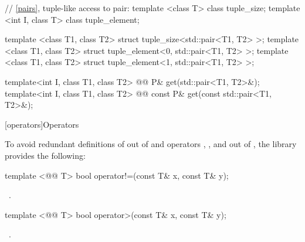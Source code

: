 \documentclass[american,twoside]{book}
\begin{document}
\begin{codeblock}
{  // \ptr\ref{pairs}, tuple-like access to pair:
  template <class T> class tuple_size;
  template <int I, class T> class tuple_element;

  template <class T1, class T2> struct tuple_size<std::pair<T1, T2> >;
  template <class T1, class T2> struct tuple_element<0, std::pair<T1, T2> >;
  template <class T1, class T2> struct tuple_element<1, std::pair<T1, T2> >;

  template<int I, class T1, class T2> 
    @@
    P& get(std::pair<T1, T2>&);
  template<int I, class T1, class T2> 
    @@
    const P& get(const std::pair<T1, T2>&);
}
\end{codeblock}

[operators]{Operators}


\pnum
To avoid redundant definitions of  out of 
and operators \tcode{>}, \tcode{<=}, and \tcode{>=} out of ,
the library provides the following:

%
\begin{itemdecl}
template <@@ T> bool operator!=(const T& x, const T& y);
\end{itemdecl}

\begin{itemdescr}
\pnum
{}

\pnum
\returns\ 
.
\end{itemdescr}

%
\begin{itemdecl}
template <@@ T> bool operator>(const T& x, const T& y);
\end{itemdecl}

\begin{itemdescr}
\pnum
{}

\pnum
\returns\ 
.
\end{itemdescr}
\end{document}
